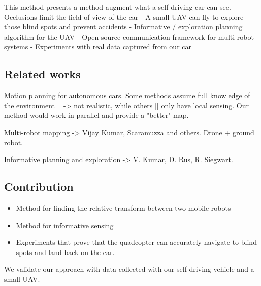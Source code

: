 This method presents a method augment what a self-driving car can see.
- Occlusions limit the field of view of the car
- A small UAV can fly to explore those blind spots and prevent accidents
- Informative / exploration planning algorithm for the UAV
- Open source communication framework for multi-robot systems
- Experiments with real data captured from our car 

\subsection{Related works}

Motion planning for autonomous cars. Some methods assume full knowledge of the environment [] -> not realistic, while others [] only have local sensing. Our method would work in parallel and provide a "better" map.

Multi-robot mapping -> Vijay Kumar, Scaramuzza and others. Drone + ground robot.

Informative planning and exploration -> V. Kumar, D. Rus, R. Siegwart.

\subsection{Contribution}

\begin{itemize}
\item
Method for finding the relative transform between two mobile robots
\item
Method for informative sensing
\item
Experiments that prove that the quadcopter can accurately navigate
to blind spots and land back on the car.
\end{itemize}

We validate our approach with data collected with our self-driving vehicle and a small UAV.
